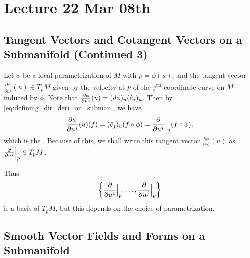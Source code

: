 \documentclass[notoc,notitlepage]{tufte-book}
\begin{document}

\chapter{Lecture 22 Mar 08th}%
\label{chp:lecture_22_mar_08th}

\section{Tangent Vectors and Cotangent Vectors on a Submanifold (Continued 3)}%
\label{sec:tangent_vectors_and_cotangent_vectors_on_a_submanifold_continued_3}

\begin{eg}\label{eg:special_case_of_the_directional_derivative}
  Let $\phi$ be a local parametrization of $M$ with $p = \phi(u)$, and the
  tangent vector $\frac{\partial \phi}{\partial u^j} (u) \in T_p M$ given by the
  velocity at $p$ of the $j$\textsuperscript{th} coordinate curve on $M$ induced
  by $\phi$. Note that $\frac{\partial \phi}{\partial u^j}(u) = (\mathop{}\!d{\phi})_u
  (\hat{e}_j)_u$. Then by \cref{eq:defining_dir_deri_on_subman}, we have
  \begin{equation*}
    \frac{\partial \phi}{\partial u^j} (u) (f) = (\hat{e}_j)_u (f \circ \phi)
    = \frac{\partial}{\partial u^j} \Big|_{u}^{} (f \circ \phi),
  \end{equation*}
  which is the . Because of this, we shall write this tangent vector
  $\frac{\partial \phi}{\partial u^j} (u)$ as $\frac{\partial}{\partial u^j}
  \Big|_{p}^{} \in T_p M$.

  Thus
  \begin{equation*}
    \left\{ \frac{\partial}{\partial u^1} \Big|_{p}^{}, \ldots,
    \frac{\partial}{\partial u^j} \Big|_{p}^{} \right\}
  \end{equation*}
  is a basis of $T_p M$, but this depends on the choice of parametrization.
\end{eg}


\section{Smooth Vector Fields and Forms on a Submanifold}%
\label{sec:smooth_vector_fields_and_forms_on_a_submanifold}
\end{document}
